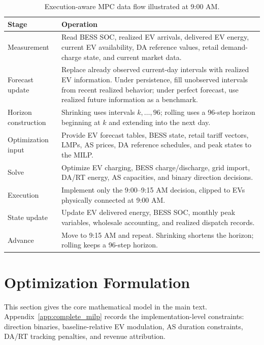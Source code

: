 \documentclass[final,5p,times]{elsarticle}
\begin{document}
\begin{table}[!t]
\centering
\caption{Execution-aware MPC data flow illustrated at 9:00 AM.}
\label{tab:execution_example}
\begin{tabularx}{\textwidth}{@{}p{}p{}@{}}
\toprule
Stage & Operation \\
\midrule
Measurement & Read BESS SOC, realized EV arrivals, delivered EV energy, current EV availability, DA reference values, retail demand-charge state, and current market data. \\
Forecast update & Replace already observed current-day intervals with realized EV information. Under persistence, fill unobserved intervals from recent realized behavior; under perfect forecast, use realized future information as a benchmark. \\
Horizon construction & Shrinking uses intervals $k,\dots,96$; rolling uses a 96-step horizon beginning at $k$ and extending into the next day. \\
Optimization input & Provide EV forecast tables, BESS state, retail tariff vectors, LMPs, AS prices, DA reference schedules, and peak states to the MILP. \\
Solve & Optimize EV charging, BESS charge/discharge, grid import, DA/RT energy, AS capacities, and binary direction decisions. \\
Execution & Implement only the 9:00--9:15 AM decision, clipped to EVs physically connected at 9:00 AM. \\
State update & Update EV delivered energy, BESS SOC, monthly peak variables, wholesale accounting, and realized dispatch records. \\
Advance & Move to 9:15 AM and repeat. Shrinking shortens the horizon; rolling keeps a 96-step horizon. \\
\bottomrule
\end{tabularx}
\end{table}

\section{Optimization Formulation}
\label{sec:model}

This section gives the core mathematical model in the main text. Appendix~\ref{app:complete_milp} records the implementation-level constraints: direction binaries, baseline-relative EV modulation, AS duration constraints, DA/RT tracking penalties, and revenue attribution.
\end{document}

